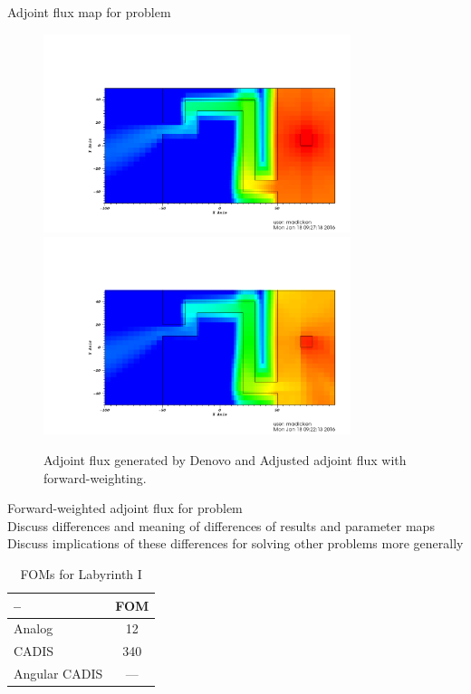 \documentclass[12pt]{article}
\begin{document}
Adjoint flux map for problem \\
\begin{figure}
  \begin{center}
    \includegraphics[width=0.80\textwidth]{./images/adjoint_flux.png}
    \includegraphics[width=0.80\textwidth]{./images/our_flux.png}
    \caption[]{\label{fig::otherflux}Adjoint flux generated by Denovo and Adjusted adjoint flux with forward-weighting.}
  \end{center}
\end{figure}

Forward-weighted adjoint flux for problem \\
Discuss differences and meaning of differences of results and parameter maps \\
Discuss implications of these differences for solving other problems more generally \\


 \begin{table}
  \centering
  \caption{\label{tab:FOMLabI}FOMs for Labyrinth I}
  \begin{tabular}{l|c}
    \toprule
    -- & FOM\\
    \hline
    Analog           & 12 \\ 
    CADIS            & 340 \\
    Angular CADIS    & --- \\  
	\bottomrule
  \end{tabular}
\end{table}
\end{document}
